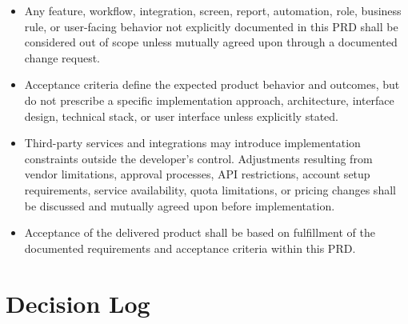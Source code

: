 \documentclass[11pt,a4paper]{article}
\begin{document}
\begin{itemize}
    \item Any feature, workflow, integration, screen, report, automation, role, business rule, or user-facing behavior not explicitly documented in this PRD shall be considered out of scope unless mutually agreed upon through a documented change request.

    \item Acceptance criteria define the expected product behavior and outcomes, but do not prescribe a specific implementation approach, architecture, interface design, technical stack, or user interface unless explicitly stated.

    \item Third-party services and integrations may introduce implementation constraints outside the developer's control. Adjustments resulting from vendor limitations, approval processes, API restrictions, account setup requirements, service availability, quota limitations, or pricing changes shall be discussed and mutually agreed upon before implementation.

    \item Acceptance of the delivered product shall be based on fulfillment of the documented requirements and acceptance criteria within this PRD.
\end{itemize}

\section{Decision Log}
\end{document}
